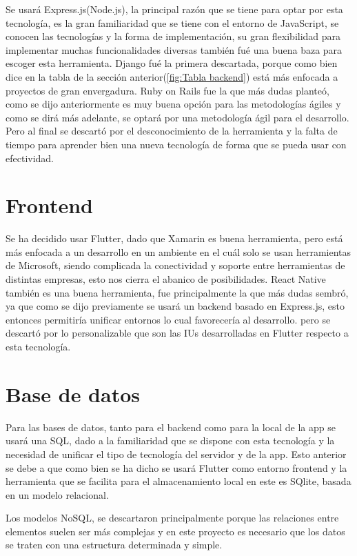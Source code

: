 Se usará Express.js(Node.js), la principal razón que se tiene para optar por esta tecnología, es la gran familiaridad que se tiene con el entorno de JavaScript, se conocen las tecnologías y la forma de implementación, su gran flexibilidad para implementar muchas funcionalidades diversas también fué una buena baza para escoger esta herramienta.
Django fué la primera descartada, porque como bien dice en la tabla de la sección anterior(\cref{fig:Tabla backend}) está más enfocada a proyectos de gran envergadura.
Ruby on Rails fue la que más dudas planteó, como se dijo anteriormente es muy buena opción para las metodologías ágiles y como se dirá más adelante, se optará por una metodología ágil para el desarrollo. Pero al final se descartó por el desconocimiento de la herramienta y la falta de tiempo para aprender bien una nueva tecnología de forma que se pueda usar con efectividad.

\section{Frontend}

Se ha decidido usar Flutter, dado que Xamarin es buena herramienta, pero está más enfocada a un desarrollo en un ambiente en el cuál solo se usan herramientas de Microsoft, siendo complicada la conectividad y soporte entre herramientas de distintas empresas, esto nos cierra el abanico de posibilidades.
React Native también es una buena herramienta, fue principalmente la que más dudas sembró, ya que como se dijo previamente se usará un backend basado en Express.js, esto entonces permitiría unificar entornos lo cual favorecería al desarrollo. pero se descartó por lo personalizable que son las IUs desarrolladas en Flutter respecto a esta tecnología.

\section{Base de datos}

Para las bases de datos, tanto para el backend como para la local de la app se usará una SQL, dado a la familiaridad que se dispone con esta tecnología y la necesidad de unificar el tipo de tecnología del servidor y de la app. Esto anterior se debe a que como bien se ha dicho se usará Flutter como entorno frontend y la herramienta que se facilita para el almacenamiento local en este es SQlite, basada en un modelo relacional.

Los modelos NoSQL, se descartaron principalmente porque las relaciones entre elementos suelen ser más complejas y en este proyecto es necesario que los datos se traten con una estructura determinada y simple.

